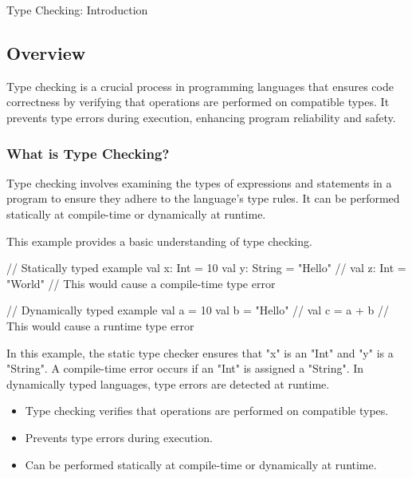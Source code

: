 \begin{notes}{Type Checking: Introduction}
    \subsection*{Overview}

    Type checking is a crucial process in programming languages that ensures code correctness by verifying that operations are performed on compatible types. It prevents type errors during execution, 
    enhancing program reliability and safety.
    
    \subsubsection*{What is Type Checking?}
    
    Type checking involves examining the types of expressions and statements in a program to ensure they adhere to the language's type rules. It can be performed statically at compile-time or dynamically at runtime.
    
    \begin{highlight}
    
        This example provides a basic understanding of type checking.
    
    \begin{code}[Scala]
    // Statically typed example
    val x: Int = 10
    val y: String = "Hello"
    // val z: Int = "World"  // This would cause a compile-time type error
    
    // Dynamically typed example
    val a = 10
    val b = "Hello"
    // val c = a + b  // This would cause a runtime type error
    \end{code}
    
        In this example, the static type checker ensures that "x" is an "Int" and "y" is a "String". A compile-time error occurs if an "Int" is assigned a "String". In dynamically typed languages, type 
        errors are detected at runtime.
    
        \begin{itemize}
            \item Type checking verifies that operations are performed on compatible types.
            \item Prevents type errors during execution.
            \item Can be performed statically at compile-time or dynamically at runtime.
        \end{itemize}
    

\end{highlight}
\end{notes}
